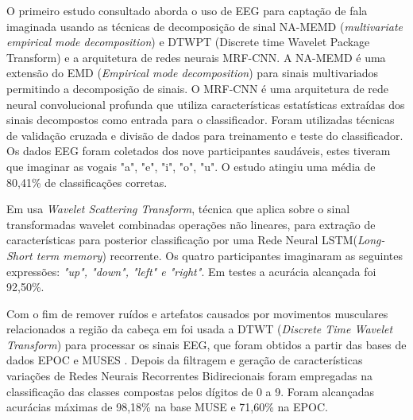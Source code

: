 	
			
			
			
			
			\par O primeiro estudo consultado \cite{ParkHyeong-jun2023Mcoi} aborda o uso de EEG para captação de fala imaginada usando as técnicas de decomposição de sinal NA-MEMD (\textit{multivariate empirical mode decomposition}) e DTWPT (Discrete time Wavelet Package Transform) e a arquitetura de redes neurais MRF-CNN. A NA-MEMD é uma extensão do EMD (\textit{Empirical mode decomposition}) para sinais multivariados permitindo a decomposição de sinais. O MRF-CNN é uma arquitetura de rede neural convolucional profunda que utiliza características estatísticas extraídas dos sinais decompostos como entrada para o classificador. Foram utilizadas técnicas de validação cruzada e divisão de dados para treinamento e teste do classificador. Os dados EEG foram coletados dos nove participantes saudáveis, estes tiveram que imaginar as vogais "a", "e", "i", "o", "u". O estudo atingiu uma média de 80,41\% de classificações corretas.
			
			\par Em \cite{AbdulghaniMokhlesM2023ISCU} usa \textit{Wavelet Scattering Transform}, técnica que aplica sobre o sinal transformadas wavelet combinadas operações não lineares, para extração de características para posterior classificação por uma Rede Neural LSTM(\textit{Long-Short term memory}) recorrente. Os quatro participantes imaginaram as seguintes expressões: \textit{"up", "down", "left" e "right"}. Em testes a acurácia alcançada foi 92,50\%.
			
			\par Com o fim de remover ruídos e artefatos causados por movimentos musculares relacionados a região da cabeça em \cite{MahapatraNrushinghCharan2023Ecoi} foi usada a DTWT (\textit{Discrete Time Wavelet Transform}) para processar os sinais EEG, que foram obtidos a partir das bases de dados EPOC e MUSES \cite{mindbigdata}. Depois da filtragem e geração de características variações de Redes Neurais Recorrentes Bidirecionais foram empregadas na classificação das classes compostas pelos dígitos de 0 a 9. Foram alcançadas acurácias máximas de 98,18\% na base MUSE e 71,60\% na EPOC.
			
